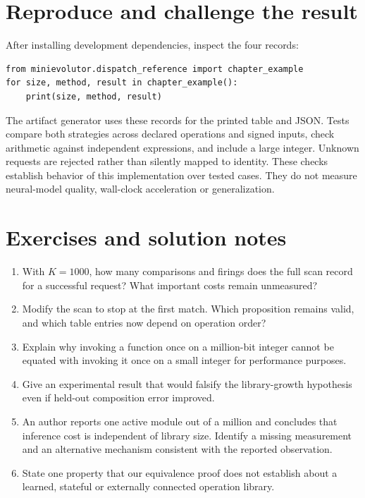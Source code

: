 \section{Reproduce and challenge the result}
After installing development dependencies, inspect the four records:
\begin{Verbatim}[fontsize=\small]
from minievolutor.dispatch_reference import chapter_example
for size, method, result in chapter_example():
    print(size, method, result)
\end{Verbatim}
The artifact generator uses these records for the printed table and JSON.
Tests compare both strategies across declared operations and signed inputs,
check arithmetic against independent expressions, and include a large integer.
Unknown requests are rejected rather than silently mapped to identity. These
checks establish behavior of this implementation over tested cases. They do
not measure neural-model quality, wall-clock acceleration or generalization.

\section{Exercises and solution notes}
\begin{enumerate}
\item With $K=1000$, how many comparisons and firings does the full scan record
for a successful request? What important costs remain unmeasured?
\item Modify the scan to stop at the first match. Which proposition remains
valid, and which table entries now depend on operation order?
\item Explain why invoking a function once on a million-bit integer cannot be
equated with invoking it once on a small integer for performance purposes.
\item Give an experimental result that would falsify the library-growth
hypothesis even if held-out composition error improved.
\item An author reports one active module out of a million and concludes that
inference cost is independent of library size. Identify a missing measurement
and an alternative mechanism consistent with the reported observation.
\item State one property that our equivalence proof does not establish about
a learned, stateful or externally connected operation library.
\end{enumerate}

